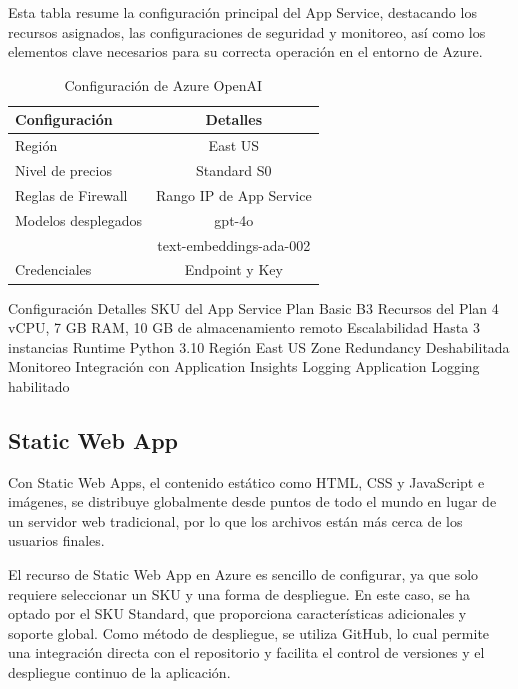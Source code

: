 Esta tabla resume la configuración principal del App Service, destacando los recursos asignados, las configuraciones de seguridad y monitoreo, así como los elementos clave necesarios para su correcta operación en el entorno de Azure.

\begin{table}[h]
	\centering
	\caption[Configuración de Azure OpenAI]{Configuración de Azure OpenAI}
	\begin{tabular}{l c}    
		\toprule
		\textbf{Configuración} 	 & \textbf{Detalles} 	\\
		\midrule
		Región              &	East US 				        \\		
		Nivel de precios    & Standard S0				      \\
		Reglas de Firewall  & Rango IP de App Service \\
    Modelos desplegados	& gpt-4o				          \\
            	          & text-embeddings-ada-002	\\
    Credenciales	      & Endpoint y Key 		      \\
		\bottomrule
		\hline
	\end{tabular}
	\label{tab:config-openai}
\end{table}

Configuración	Detalles
SKU del App Service Plan	Basic B3
Recursos del Plan	4 vCPU, 7 GB RAM, 10 GB de almacenamiento remoto
Escalabilidad	Hasta 3 instancias
Runtime	Python 3.10
Región	East US
Zone Redundancy	Deshabilitada
Monitoreo	Integración con Application Insights
Logging	Application Logging habilitado

\subsection{Static Web App}

Con Static Web Apps, el contenido estático como HTML, CSS y JavaScript e imágenes, se distribuye globalmente desde puntos de todo el mundo en lugar de un servidor web tradicional, por lo que los archivos están más cerca de los usuarios finales.

El recurso de Static Web App en Azure es sencillo de configurar, ya que solo requiere seleccionar un SKU y una forma de despliegue. En este caso, se ha optado por el SKU Standard, que proporciona características adicionales y soporte global. Como método de despliegue, se utiliza GitHub, lo cual permite una integración directa con el repositorio y facilita el control de versiones y el despliegue continuo de la aplicación.

